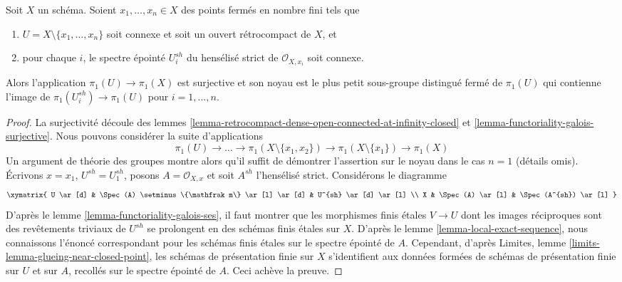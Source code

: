 \begin{lemma}
\label{lemma-exact-sequence-finite-nr-closed-pts}
Soit $X$ un schéma. Soient $x_1, \ldots, x_n \in X$ des points fermés en nombre fini
tels que
\begin{enumerate}
\item $U = X \setminus \{x_1, \ldots, x_n\}$ soit connexe et soit
un ouvert rétrocompact de $X$, et
\item pour chaque $i$, le spectre épointé $U_i^{sh}$ du
hensélisé strict de $\mathcal{O}_{X, x_i}$ soit connexe.
\end{enumerate}
Alors l'application $\pi_1(U) \to \pi_1(X)$ est surjective et son noyau
est le plus petit sous-groupe distingué fermé de $\pi_1(U)$ qui contienne
l'image de $\pi_1(U_i^{sh}) \to \pi_1(U)$ pour $i = 1, \ldots, n$.
\end{lemma}

\begin{proof}
La surjectivité découle des
lemmes \ref{lemma-retrocompact-dense-open-connected-at-infinity-closed} et
\ref{lemma-functoriality-galois-surjective}.
Nous pouvons considérer la suite d'applications
$$
\pi_1(U)  \to \ldots \to
\pi_1(X \setminus \{x_1, x_2\}) \to \pi_1(X \setminus \{x_1\}) \to \pi_1(X)
$$
Un argument de théorie des groupes montre alors qu'il suffit de démontrer l'assertion sur le
noyau dans le cas $n = 1$ (détails omis). Écrivons
$x = x_1$, $U^{sh} = U_1^{sh}$,
posons $A = \mathcal{O}_{X, x}$ et soit $A^{sh}$ l'hensélisé strict.
Considérons le diagramme
$$
\xymatrix{
U \ar[d] &
\Spec(A) \setminus \{\mathfrak m\} \ar[l] \ar[d] &
U^{sh} \ar[d] \ar[l] \\
X & \Spec(A) \ar[l] & \Spec(A^{sh}) \ar[l]
}
$$
D'après le lemme \ref{lemma-functoriality-galois-ses},
il faut montrer que les morphismes finis étales
$V \to U$ dont les images réciproques sont des revêtements triviaux de $U^{sh}$
se prolongent en des schémas finis étales sur $X$.
D'après le lemme \ref{lemma-local-exact-sequence},
nous connaissons l'énoncé correspondant
pour les schémas finis étales sur le spectre épointé de $A$.
Cependant, d'après Limites, lemme \ref{limits-lemma-glueing-near-closed-point},
les schémas de présentation finie sur $X$ s'identifient aux données formées de
schémas de présentation finie sur $U$ et sur $A$, recollés sur
le spectre épointé de $A$. Ceci achève la preuve.
\end{proof}









